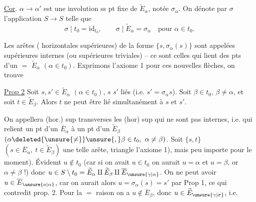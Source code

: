 \noindent\vrule\hspace{.5em}\begin{minipage}{.89\linewidth}\uline{Cor}. \quad $\alpha\longrightarrow\alpha'$ est une involution ss pt fixe de $\widetilde E_\alpha$, notée $\sigma_\alpha$. On dénote par $\sigma$ l'application $S\longrightarrow S$ telle que
\[
\sigma\mid t_0=\mathrm{id}_{t_0},\qquad
\sigma\mid\widetilde E_\alpha=\sigma_\alpha\quad\text{pour }\alpha\in t_0.
\]
\end{minipage}

Les arêtes ( horizontales supérieures) de la forme $\{s,\sigma_\alpha(s)\}$ sont appelées supérieures internes (ou supérieures triviales) -- ce sont celles qui lient des pts d'un $=$ $\widetilde E_\alpha$ $(\alpha\in t_0)$. Exprimons l'axiome 1 pour ces nouvelles flèches, on trouve

\noindent\vrule\hspace{.5em}\begin{minipage}{.89\linewidth}\uline{Prop 2} \quad Soit $s,s'\in\widetilde E_\alpha$ $(\alpha\in t_0)$, $s$  $s'$ liés (i.e. $s'=\sigma_\alpha s$). Soit $\beta\in t_0$, $\beta\ne\alpha$, et soit $t\in\widetilde E_\beta$. Alors $t$ ne peut être lié simultanément à $s$ et $s'$.\end{minipage}

On appellera  (hor.) sup transverses les  (hor) sup qui ne sont pas internes, i.e. qui  relient un pt d'un $\overline E_\alpha$ à un pt d'un $\widetilde E_\beta$ $(\alpha\deleted{\unsure{\ne}}\unsure{,}\beta\in t_0,\ \alpha\ne\beta)$. Soit $\{s,t\}$ $(s\in\overline E_\alpha,\ t\in\widetilde E_\beta)$ une telle arête,    triangle    l'axiome 1), mais peu importe pour le moment). Évidemt $u\notin t_0$ (car si on avait $u\in t_0$ on  aurait $u=\alpha$ et $u=\beta$, or $\alpha\ne\beta$ !) donc $u\in S\setminus t_0=\widetilde E_\alpha\amalg\widetilde E_\beta\amalg\overline E_{\unsure{\gamma|\alpha}}$. On ne peut avoir $u\in\overline E_{\unsure{a|\alpha}}$, car on aurait alors $u=\sigma_\alpha(s)=s'$ par Prop 1, ce qui contredit prop. 2. Pour la $=$ raison on  a $u\notin\overline E_\beta$, donc $u\in\widetilde E_{\unsure{\gamma|\sigma}}$, i.e.

